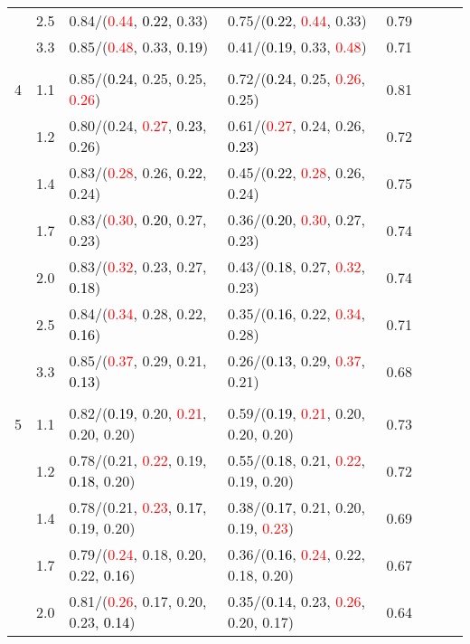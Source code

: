\documentclass[10pt,a4paper]{report}
\begin{document}
\begin{table}[!htbp]
\begin{center}
{\begin{tabular}{ccllcccc}
			&2.5&0.84/(\textcolor{red}{0.44}, \textcolor{black}{0.22}, 0.33)&0.75/(\textcolor{black}{0.22}, \textcolor{red}{0.44}, 0.33)&0.79\\
			&3.3&0.85/(\textcolor{red}{0.48}, 0.33, \textcolor{black}{0.19})&0.41/(\textcolor{black}{0.19}, 0.33, \textcolor{red}{0.48})&0.71\\
			&&&&\\
			4			&1.1&0.85/(\textcolor{black}{0.24}, 0.25, 0.25, \textcolor{red}{0.26})&0.72/(\textcolor{black}{0.24}, 0.25, \textcolor{red}{0.26}, 0.25)&0.81\\
			&1.2&0.80/(0.24, \textcolor{red}{0.27}, \textcolor{black}{0.23}, 0.26)&0.61/(\textcolor{red}{0.27}, 0.24, 0.26, \textcolor{black}{0.23})&0.72\\
			&1.4&0.83/(\textcolor{red}{0.28}, 0.26, \textcolor{black}{0.22}, 0.24)&0.45/(\textcolor{black}{0.22}, \textcolor{red}{0.28}, 0.26, 0.24)&0.75\\
			&1.7&0.83/(\textcolor{red}{0.30}, \textcolor{black}{0.20}, 0.27, 0.23)&0.36/(\textcolor{black}{0.20}, \textcolor{red}{0.30}, 0.27, 0.23)&0.74\\
			&2.0&0.83/(\textcolor{red}{0.32}, 0.23, 0.27, \textcolor{black}{0.18})&0.43/(\textcolor{black}{0.18}, 0.27, \textcolor{red}{0.32}, 0.23)&0.74\\
			&2.5&0.84/(\textcolor{red}{0.34}, 0.28, 0.22, \textcolor{black}{0.16})&0.35/(\textcolor{black}{0.16}, 0.22, \textcolor{red}{0.34}, 0.28)&0.71\\
			&3.3&0.85/(\textcolor{red}{0.37}, 0.29, 0.21, \textcolor{black}{0.13})&0.26/(\textcolor{black}{0.13}, 0.29, \textcolor{red}{0.37}, 0.21)&0.68\\
			&&&&\\
			5			&1.1&0.82/(\textcolor{black}{0.19}, 0.20, \textcolor{red}{0.21}, 0.20, 0.20)&0.59/(\textcolor{black}{0.19}, \textcolor{red}{0.21}, 0.20, 0.20, 0.20)&0.73\\
			&1.2&0.78/(0.21, \textcolor{red}{0.22}, 0.19, \textcolor{black}{0.18}, 0.20)&0.55/(\textcolor{black}{0.18}, 0.21, \textcolor{red}{0.22}, 0.19, 0.20)&0.72\\
			&1.4&0.78/(0.21, \textcolor{red}{0.23}, \textcolor{black}{0.17}, 0.19, 0.20)&0.38/(\textcolor{black}{0.17}, 0.21, 0.20, 0.19, \textcolor{red}{0.23})&0.69\\
			&1.7&0.79/(\textcolor{red}{0.24}, 0.18, 0.20, 0.22, \textcolor{black}{0.16})&0.36/(\textcolor{black}{0.16}, \textcolor{red}{0.24}, 0.22, 0.18, 0.20)&0.67\\
			&2.0&0.81/(\textcolor{red}{0.26}, 0.17, 0.20, 0.23, \textcolor{black}{0.14})&0.35/(\textcolor{black}{0.14}, 0.23, \textcolor{red}{0.26}, 0.20, 0.17)&0.64\\

\end{tabular}}
\end{center}
\end{table}
\end{document}
